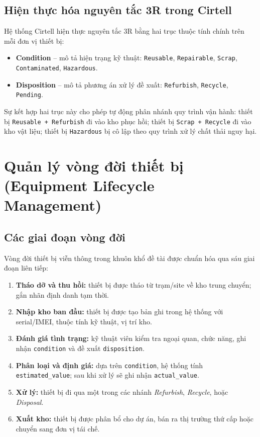 \subsection{Hiện thực hóa nguyên tắc 3R trong Cirtell}
Hệ thống Cirtell hiện thực nguyên tắc 3R bằng hai trục thuộc tính chính trên mỗi đơn vị thiết bị:

\begin{itemize}[leftmargin=1.2cm]
    \item \textbf{Condition} -- mô tả hiện trạng kỹ thuật: \texttt{Reusable}, \texttt{Repairable}, \texttt{Scrap}, \texttt{Contaminated}, \texttt{Hazardous}.
    \item \textbf{Disposition} -- mô tả phương án xử lý đề xuất: \texttt{Refurbish}, \texttt{Recycle}, \texttt{Pending}.
\end{itemize}

Sự kết hợp hai trục này cho phép tự động phân nhánh quy trình vận hành: thiết bị \texttt{Reusable + Refurbish} đi vào kho phục hồi; thiết bị \texttt{Scrap + Recycle} đi vào kho vật liệu; thiết bị \texttt{Hazardous} bị cô lập theo quy trình xử lý chất thải nguy hại.

\section{Quản lý vòng đời thiết bị (Equipment Lifecycle Management)}
\label{sec:eolc}

\subsection{Các giai đoạn vòng đời}
Vòng đời thiết bị viễn thông trong khuôn khổ đề tài được chuẩn hóa qua sáu giai đoạn liên tiếp:

\begin{enumerate}[leftmargin=1.2cm]
    \item \textbf{Tháo dỡ và thu hồi:} thiết bị được tháo từ trạm/site về kho trung chuyển; gắn nhãn định danh tạm thời.
    \item \textbf{Nhập kho ban đầu:} thiết bị được tạo bản ghi trong hệ thống với serial/IMEI, thuộc tính kỹ thuật, vị trí kho.
    \item \textbf{Đánh giá tình trạng:} kỹ thuật viên kiểm tra ngoại quan, chức năng, ghi nhận \texttt{condition} và đề xuất \texttt{disposition}.
    \item \textbf{Phân loại và định giá:} dựa trên \texttt{condition}, hệ thống tính \texttt{estimated\_value}; sau khi xử lý sẽ ghi nhận \texttt{actual\_value}.
    \item \textbf{Xử lý:} thiết bị đi qua một trong các nhánh \emph{Refurbish}, \emph{Recycle}, hoặc \emph{Disposal}.
    \item \textbf{Xuất kho:} thiết bị được phân bổ cho dự án, bán ra thị trường thứ cấp hoặc chuyển sang đơn vị tái chế.
\end{enumerate}

